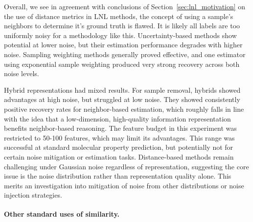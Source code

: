 Overall, we see in agreement with conclusions of Section~\ref{sec:lnl_motivation} on the use of distance metrics in LNL methods, the concept of using a sample's neighbors to determine it's ground truth is flawed. It is likely all labels are too uniformly noisy for a methodology like this. Uncertainty-based methods show potential at lower noise, but their estimation performance degrades with higher noise. Sampling weighting methods generally proved effective, and one estimator using exponential sample weighting produced very strong recovery across both noise levels.

Hybrid representations had mixed results. For sample removal, hybrids showed advantages at high noise, but struggled at low noise. They showed consistently positive recovery rates for neighbor-based estimation, which roughly falls in line with the idea that a low-dimension, high-quality information representation benefits neighbor-based reasoning. The feature budget in this experiment was restricted to 50-100 features, which may limit its advantages. This range was successful at standard molecular property prediction, but potentially not for certain noise mitigation or estimation tasks. Distance-based methods remain challenging under Gaussian noise regardless of representation, suggesting the core issue is the noise distribution rather than representation quality alone. This merits an investigation into mitigation of noise from other distributions or noise injection strategies.


\paragraph{Other standard uses of similarity.}

